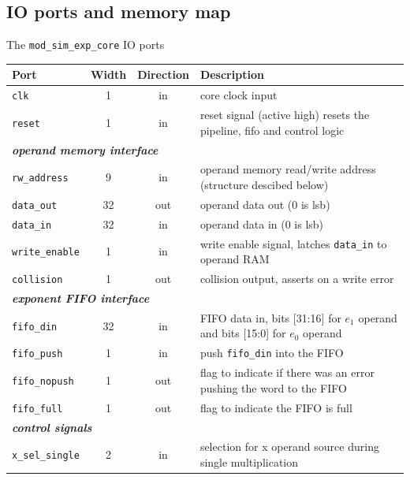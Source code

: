 \newpage
\subsection{IO ports and memory map}
The \verb|mod_sim_exp_core| IO ports\\
\newline
\begin{tabular}{|l|c|c|p{8cm}|}
\hline
\rowcolor{Gray}
\textbf{Port} & \textbf{Width} & \textbf{Direction} & \textbf{Description} \bigstrut\\
\hline
\verb|clk|   & 1     & in    & core clock input \bigstrut\\
\hline
\verb|reset| & 1     & in    & reset signal (active high) resets the pipeline, fifo and control logic \bigstrut\\
\hline
\multicolumn{4}{|l|}{\textbf{\textit{operand memory interface}}} \bigstrut\\
\hline
\verb|rw_address| & 9     & in    & operand memory read/write address (structure descibed below) \bigstrut\\
\hline
\verb|data_out| & 32    & out   & operand data out (0 is lsb) \bigstrut\\
\hline
\verb|data_in| & 32    & in    & operand data in (0 is lsb) \bigstrut\\
\hline
\verb|write_enable| & 1     & in    & write enable signal, latches \verb|data_in| to operand RAM \bigstrut\\
\hline
\verb|collision| & 1     & out   & collision output, asserts on a write error \bigstrut\\
\hline
\multicolumn{4}{|l|}{\textbf{\textit{exponent FIFO interface}}} \bigstrut\\
\hline
\verb|fifo_din| & 32    & in    & FIFO data in, bits [31:16] for $e_1$ operand and bits [15:0] for $e_0$ operand \bigstrut\\
\hline
\verb|fifo_push| & 1     & in    & push \verb|fifo_din| into the FIFO \bigstrut\\
\hline
\verb|fifo_nopush| & 1     & out   & flag to indicate if there was an error pushing the word to the FIFO \bigstrut\\
\hline
\verb|fifo_full| & 1     & out   & flag to indicate the FIFO is full \bigstrut\\
\hline
\multicolumn{4}{|l|}{\textbf{\textit{control signals}}} \bigstrut\\
\hline
\verb|x_sel_single| & 2     & in    & selection for x operand source during single multiplication \bigstrut\\

\end{tabular}
